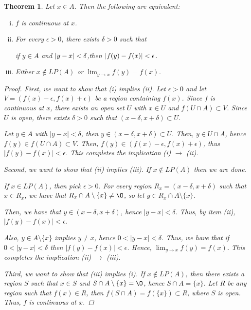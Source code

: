 \documentclass[11pt]{article}
\renewcommand{\emptyset}{\O}
\renewcommand{\_}[1]{\underline{ #1 }}
\DeclarePairedDelimiter{\abs}{\lvert}{\rvert}
\newtheorem{theorem}{Theorem}[section]
\theoremstyle{definition}
\numberwithin{equation}{subsection}
\begin{document}
\begin{theorem}
	Let $x\in A$. Then the following are equivalent:
	\begin{enumerate}[(i)]
		\item $f$ is continuous at $x$.
        


		\item For every $\epsilon > 0$, there exists $\delta > 0$ such that 
		\begin{center}
			if $y \in A$ and $\abs{y - x} < \delta$,\qquad then $\abs{f(y) - f(x)} < \epsilon$.
		\end{center}
        


		\item Either $x \notin LP(A)$ or $\displaystyle \lim_{y \to x} f(y) = f(x)$.
    
	\end{enumerate}
    
\begin{proof}
First, we want to show that (i) implies (ii). Let $\epsilon>0$ and let $V = (f(x)-\epsilon, f(x)+\epsilon)$ be a region containing $f(x)$. Since $f$ is continuous at $x$, there exists an open set $U$ with $x \in U$ and $f(U\cap A) \subset V$. Since $U$ is open, there exists $\delta>0$ such that $(x-\delta,x+\delta)\subset U$. 

Let $y \in A$ with $|y-x|<\delta$, then $y\in (x-\delta,x+\delta)\subset U$. Then, $y \in U \cap A$, hence $f(y) \in f(U \cap A) \subset V$. Then, $f(y) \in (f(x)-\epsilon, f(x)+\epsilon)$, thus $|f(y)-f(x)| < \epsilon$. This completes the implication (i) $\rightarrow$ (ii).

Second, we want to show that (ii) implies (iii). If $x \notin LP(A)$ then we are done. 

If $x \in LP(A)$, then pick $\epsilon>0$. For every region $R_x=(x-\delta,x+\delta)$ such that $x\in R_x$, we have that $R_x \cap A \setminus \{x\} \neq \emptyset$, so let $y\in R_x \cap A \setminus \{x\}$. 

Then, we have that $y \in (x-\delta,x+\delta)$, hence $|y-x|<\delta$. Thus, by item (ii), $|f(y)-f(x)|<\epsilon$. 

Also, $y \in A \setminus \{x\}$ implies $y\neq x$, hence $0<|y-x|<\delta$. Thus, we have that if $0<|y-x|<\delta$ then $|f(y)-f(x)|<\epsilon$. Hence, $\lim_{y \to x} f(y) = f(x)$. This completes the implication (ii) $\rightarrow$ (iii).

Third, we want to show that (iii) implies (i). If $x \notin LP(A)$, then there exists a region $S$ such that $x\in S$ and $S\cap A\setminus \{x\}=\emptyset$, hence $S \cap A = \{x\}$. Let $R$ be any region such that $f(x) \in R$, then $f(S \cap A) = f(\{x\}) \subset R$, where $S$ is open. Thus, $f$ is continuous at $x$.


\end{proof}
\end{theorem}
\end{document}
